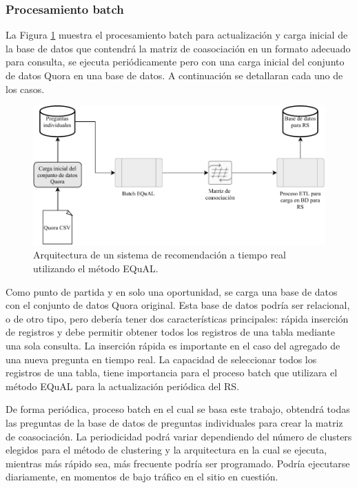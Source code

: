 \subsubsection{Procesamiento batch}
La Figura \ref{fig:implementacionrsbatch} muestra el procesamiento batch para actualización y carga inicial de la base de datos que contendrá la matriz de coasociación en un formato adecuado para consulta, se ejecuta periódicamente pero con una carga inicial del conjunto de datos Quora en una base de datos. A continuación se detallaran cada uno de los casos.

\begin{figure}
	\centering
	\includegraphics[width=0.9\linewidth]{8_problema_investigacion/imagenes/implementacion_rs_batch}
	\caption{Arquitectura de un sistema de recomendación a tiempo real utilizando el método EQuAL.}
	\label{fig:implementacionrsbatch}
\end{figure}

Como punto de partida y en solo una oportunidad, se carga una base de datos con el conjunto de datos Quora original. Esta base de datos podría ser relacional, o de otro tipo, pero debería tener dos características principales: rápida inserción de registros y debe permitir obtener todos los registros de una tabla mediante una sola consulta. La inserción rápida es importante en el caso del agregado de una nueva pregunta en tiempo real. La capacidad de seleccionar todos los registros de una tabla, tiene importancia para el proceso batch que utilizara el método EQuAL para la actualización periódica del RS.

\bigskip De forma periódica, proceso batch en el cual se basa este trabajo, obtendrá todas las preguntas de la base de datos de preguntas individuales para crear la matriz de coasociación. La periodicidad podrá variar dependiendo del número de clusters elegidos para el método de clustering y la arquitectura en la cual se ejecuta, mientras más rápido sea, más frecuente podría ser programado. Podría ejecutarse diariamente, en momentos de bajo tráfico en el sitio en cuestión.

